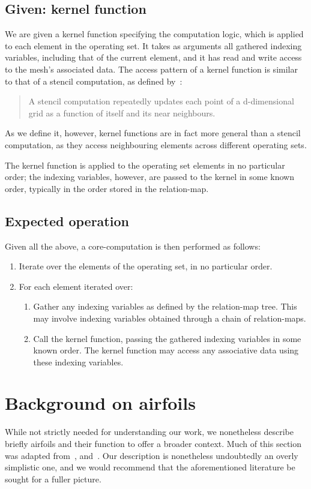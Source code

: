\subsection{Given: kernel function}
\label{subsec:given-kernel-function}
We are given a kernel function specifying the computation logic, which is applied to each element in the operating set. It takes as arguments all gathered indexing variables, including that of the current element, and it has read and write access to the mesh's associated data. The access pattern of a kernel function is similar to that of a stencil computation, as defined by~\cite{tang2011pochoir}:
\begin{quote}
A stencil computation repeatedly updates each point of a d-dimensional grid as a function of itself and its near neighbours.
\end{quote}
As we define it, however, kernel functions are in fact more general than a stencil computation, as they access neighbouring elements across different operating sets.


The kernel function is applied to the operating set elements in no particular order; the indexing variables, however, are passed to the kernel in some known order, typically in the order stored in the relation-map.


\subsection{Expected operation}
Given all the above, a core-computation is then performed as follows:
\begin{enumerate}
\item Iterate over the elements of the operating set, in no particular order.
\item For each element iterated over:
    \begin{enumerate}
    \item Gather any indexing variables as defined by the relation-map tree. This may involve indexing variables obtained through a chain of relation-maps.
    \item Call the kernel function, passing the gathered indexing variables in some known order. The kernel function may access any associative data using these indexing variables.
    \end{enumerate}
\end{enumerate}



\section{Background on airfoils}
While not strictly needed for understanding our work, we nonetheless describe briefly airfoils and their function to offer a broader context. Much of this section was adapted from~\cite{abbott2012theory}, \cite{kuethe1986foundations} and~\cite{boeing2014airfoil}. Our description is nonetheless undoubtedly an overly simplistic one, and we would recommend that the aforementioned literature be sought for a fuller picture.

